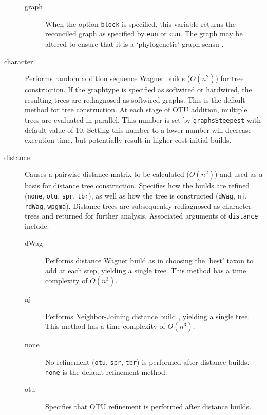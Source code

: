 \begin{description}
\begin{description}
			\item[graph] When the option \texttt{block} is specified, this variable returns the 
			reconciled graph as specified by \texttt{eun} or \texttt{cun}. The graph may be 
			altered to ensure that it is a `phylogenetic' graph sensu \cite{Moretetal2005}.
			
		\end{description}			
		
		\item [character] Performs random addition sequence Wagner \citep{Farris1970} builds 
		($O(n^2)$) for tree construction. If the graphtype is specified as softwired or hardwired, 
		the resulting trees are rediagnosed as softwired graphs. This is the default method for 
		tree construction. At each stage of OTU addition, multiple trees are evaluated in parallel. 
		This number is set by \texttt{graphsSteepest} with default value of 10. Setting this number 
		to a lower number will decrease execution time, but potentially result in
		higher cost initial builds.
		
		\item [distance] Causes a pairwise distance matrix to be calculated ($O(n^2)$) and used 
		as a basis for distance tree construction. Specifies how the builds are refined (\texttt{none}, 
		\texttt{otu}, \texttt{spr}, \texttt{tbr}), as well as how the tree is constructed (\texttt{dWag}, 
		\texttt{nj}, \texttt{rdWag}, \texttt{wpgma}). Distance trees are subsequently rediagnosed 
		as character trees and returned for further analysis. Associated arguments of \texttt{distance} 
		include:
					
		\begin{description}
		
			\item[dWag] Performs distance Wagner build as in \citep{Farris1972} choosing the 
			`best' taxon to add at each step, yielding a single tree. This method has a time 
			complexity of $O(n^3)$.

			\item[nj] Performs Neighbor-Joining distance build \citep{Saitou1987}, yielding a single 
			tree. This method has a time complexity of $O(n^3)$.

			\item[none] No refinement (\texttt{otu}, \texttt{spr}, \texttt{tbr}) is performed after 
			distance builds. \texttt{none} is the default refinement method.
						
			\item[otu] Specifies that OTU refinement \citep{Wheeler2021} is performed 
			after distance builds.
			

\end{description}
\end{description}
